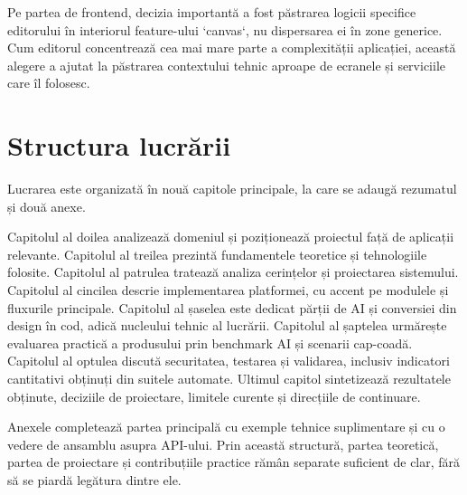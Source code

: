 Pe partea de frontend, decizia importantă a fost păstrarea logicii specifice editorului în interiorul feature-ului `canvas`, nu dispersarea ei în zone generice. Cum editorul concentrează cea mai mare parte a complexității aplicației, această alegere a ajutat la păstrarea contextului tehnic aproape de ecranele și serviciile care îl folosesc.

\section{Structura lucrării}

Lucrarea este organizată în nouă capitole principale, la care se adaugă rezumatul și două anexe.

Capitolul al doilea analizează domeniul și poziționează proiectul față de aplicații relevante. Capitolul al treilea prezintă fundamentele teoretice și tehnologiile folosite. Capitolul al patrulea tratează analiza cerințelor și proiectarea sistemului. Capitolul al cincilea descrie implementarea platformei, cu accent pe modulele și fluxurile principale. Capitolul al șaselea este dedicat părții de AI și conversiei din design în cod, adică nucleului tehnic al lucrării. Capitolul al șaptelea urmărește evaluarea practică a produsului prin benchmark AI și scenarii cap-coadă. Capitolul al optulea discută securitatea, testarea și validarea, inclusiv indicatori cantitativi obținuți din suitele automate. Ultimul capitol sintetizează rezultatele obținute, deciziile de proiectare, limitele curente și direcțiile de continuare.

Anexele completează partea principală cu exemple tehnice suplimentare și cu o vedere de ansamblu asupra API-ului. Prin această structură, partea teoretică, partea de proiectare și contribuțiile practice rămân separate suficient de clar, fără să se piardă legătura dintre ele.
